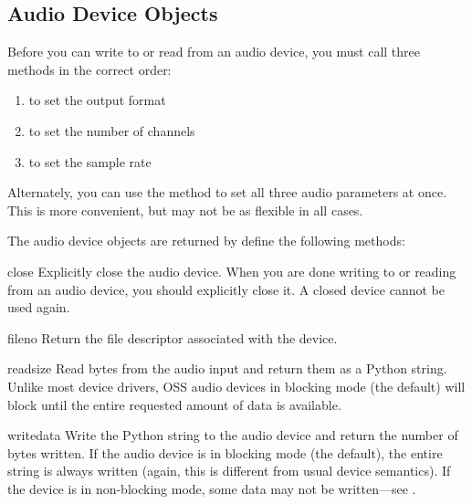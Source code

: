 \subsection{Audio Device Objects \label{ossaudio-device-objects}}

Before you can write to or read from an audio device, you must call
three methods in the correct order:
\begin{enumerate}
\item {} to set the output format
\item {} to set the number of channels
\item {} to set the sample rate
\end{enumerate}
Alternately, you can use the  method to set all
three audio parameters at once.  This is more convenient, but may not be
as flexible in all cases.

The audio device objects are returned by  define the
following methods:

\begin{methoddesc}{close}{}
Explicitly close the audio device.  When you are done writing to or
reading from an audio device, you should explicitly close it.  A closed
device cannot be used again.
\end{methoddesc}

\begin{methoddesc}{fileno}{}
Return the file descriptor associated with the device.
\end{methoddesc}

\begin{methoddesc}{read}{size}
Read  bytes from the audio input and return them as a Python
string.  Unlike most \UNIX{} device drivers, OSS audio devices in
blocking mode (the default) will block  until the
entire requested amount of data is available.
\end{methoddesc}

\begin{methoddesc}{write}{data}
Write the Python string  to the audio device and return the
number of bytes written.  If the audio device is in blocking mode (the
default), the entire string is always written (again, this is different
from usual \UNIX{} device semantics).  If the device is in non-blocking
mode, some data may not be written---see .
\end{methoddesc}

